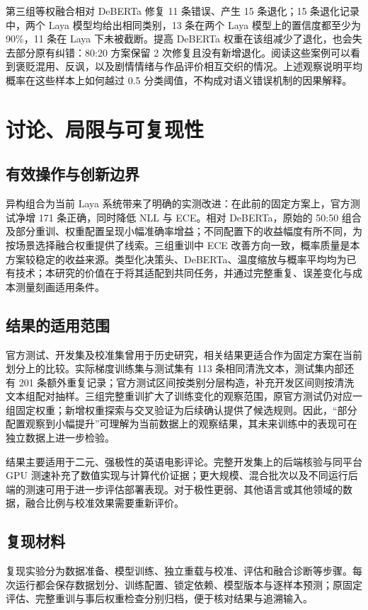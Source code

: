 \documentclass[UTF8,fontset=fandol,a4paper,11pt]{ctexart}
\begin{document}
第三组等权融合相对 DeBERTa 修复 11 条错误、产生 15 条退化；15 条退化记录中，两个 Laya 模型均给出相同类别，13 条在两个 Laya 模型上的置信度都至少为 90\%，11 条在 Laya 下未被截断。提高 DeBERTa 权重在该组减少了退化，也会失去部分原有纠错：80:20 方案保留 2 次修复且没有新增退化。阅读这些案例可以看到褒贬混用、反讽，以及剧情情绪与作品评价相互交织的情况。上述观察说明平均概率在这些样本上如何越过 0.5 分类阈值，不构成对语义错误机制的因果解释。

\section{讨论、局限与可复现性}
\subsection{有效操作与创新边界}
异构组合为当前 Laya 系统带来了明确的实测改进：在此前的固定方案上，官方测试净增 171 条正确，同时降低 NLL 与 ECE。相对 DeBERTa，原始的 50:50 组合及部分重训、权重配置呈现小幅准确率增益；不同配置下的收益幅度有所不同，为按场景选择融合权重提供了线索。三组重训中 ECE 改善方向一致，概率质量是本方案较稳定的收益来源。类型化决策头、DeBERTa、温度缩放与概率平均均为已有技术；本研究的价值在于将其适配到共同任务，并通过完整重复、误差变化与成本测量刻画适用条件。

\subsection{结果的适用范围}
官方测试、开发集及校准集曾用于历史研究，相关结果更适合作为固定方案在当前划分上的比较。实际梯度训练集与测试集有 113 条相同清洗文本，测试集内部还有 201 条额外重复记录；官方测试区间按类别分层构造，补充开发区间则按清洗文本组配对抽样。三组完整重训扩大了训练变化的观察范围，原官方测试仍对应一组固定权重；新增权重探索与交叉验证为后续确认提供了候选规则。因此，“部分配置观察到小幅提升”可理解为当前数据上的观察结果，其未来训练中的表现可在独立数据上进一步检验。

结果主要适用于二元、强极性的英语电影评论。完整开发集上的后端核验与同平台 GPU 测速补充了数值实现与计算代价证据；更大规模、混合批次以及不同运行后端的测速可用于进一步评估部署表现。对于极性更弱、其他语言或其他领域的数据，融合比例与校准效果需要重新评价。

\subsection{复现材料}
复现实验分为数据准备、模型训练、独立重载与校准、评估和融合诊断等步骤。每次运行都会保存数据划分、训练配置、锁定依赖、模型版本与逐样本预测；原固定评估、完整重训与事后权重检查分别归档，便于核对结果与追溯输入。
\end{document}
